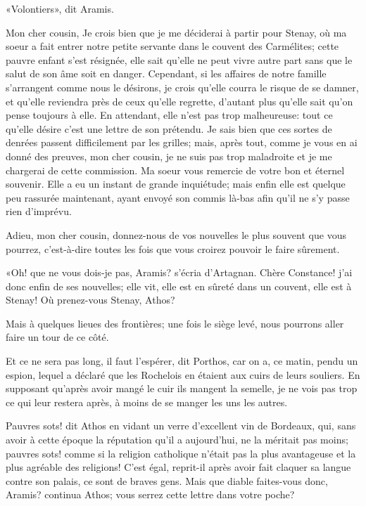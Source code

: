 «Volontiers», dit Aramis. 
\begin{mail}{}{Mon cher cousin,}
Je crois bien que je me déciderai à partir pour Stenay, où ma soeur a fait entrer notre petite servante dans le couvent des Carmélites; cette pauvre enfant s'est résignée, elle sait qu'elle ne peut vivre autre part sans que le salut de son âme soit en danger. Cependant, si les affaires de notre famille s'arrangent comme nous le désirons, je crois qu'elle courra le risque de se damner, et qu'elle reviendra près de ceux qu'elle regrette, d'autant plus qu'elle sait qu'on pense toujours à elle. En attendant, elle n'est pas trop malheureuse: tout ce qu'elle désire c'est une lettre de son prétendu. Je sais bien que ces sortes de denrées passent difficilement par les grilles; mais, après tout, comme je vous en ai donné des preuves, mon cher cousin, je ne suis pas trop maladroite et je me chargerai de cette commission. Ma soeur vous remercie de votre bon et éternel souvenir. Elle a eu un instant de grande inquiétude; mais enfin elle est quelque peu rassurée maintenant, ayant envoyé son commis là-bas afin qu'il ne s'y passe rien d'imprévu.

Adieu, mon cher cousin, donnez-nous de vos nouvelles le plus souvent que vous pourrez, c'est-à-dire toutes les fois que vous croirez pouvoir le faire sûrement.
\end{mail}


«Oh! que ne vous dois-je pas, Aramis? s'écria d'Artagnan. Chère Constance! j'ai donc enfin de ses nouvelles; elle vit, elle est en sûreté dans un couvent, elle est à Stenay! Où prenez-vous Stenay, Athos? 

\speak  Mais à quelques lieues des frontières; une fois le siège levé, nous pourrons aller faire un tour de ce côté. 

\speak  Et ce ne sera pas long, il faut l'espérer, dit Porthos, car on a, ce matin, pendu un espion, lequel a déclaré que les Rochelois en étaient aux cuirs de leurs souliers. En supposant qu'après avoir mangé le cuir ils mangent la semelle, je ne vois pas trop ce qui leur restera après, à moins de se manger les uns les autres. 

\speak  Pauvres sots! dit Athos en vidant un verre d'excellent vin de Bordeaux, qui, sans avoir à cette époque la réputation qu'il a aujourd'hui, ne la méritait pas moins; pauvres sots! comme si la religion catholique n'était pas la plus avantageuse et la plus agréable des religions! C'est égal, reprit-il après avoir fait claquer sa langue contre son palais, ce sont de braves gens. Mais que diable faites-vous donc, Aramis? continua Athos; vous serrez cette lettre dans votre poche? 

